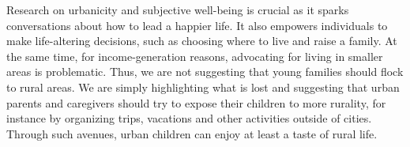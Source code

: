 \documentclass[10pt, letterpaper]{article}
\begin{document}
\begin{spacing}{1.4}
Research on urbanicity and subjective well-being is crucial as it sparks
conversations about how to lead a happier life. It also empowers individuals to
make life-altering decisions, such as choosing where to live and raise a
family. At the same time, for income-generation reasons, advocating for living
in smaller areas is  problematic. Thus, we are not suggesting that young
families should flock to rural areas. We are simply highlighting what is lost and suggesting that urban parents and caregivers should try to expose their children to more rurality, for instance by organizing
trips, vacations and other activities outside of cities. Through such avenues,
urban children can enjoy at least a taste of rural life. 


                                                       


    



\end{spacing}
\end{document}
